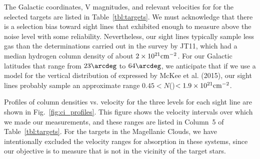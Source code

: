 \documentclass[modern]{aastex63}
\begin{document}
The Galactic coordinates, V magnitudes, and relevant velocities for  for the selected 
targets are listed in Table~\ref{tbl:targets}.   We must acknowledge that there is a selection bias 
toward sight lines that exhibited enough  to measure above the noise level with some 
reliability.  Nevertheless, our sight lines typically sample less gas than the determinations 
carried out in the survey by JT11, which had a median hydrogen column density of about 
$2\times 10^{21}{\rm cm}^{-2}$.  For our Galactic latitudes that range from $23\arcdeg$ to 
$64\arcdeg$, we anticipate that if we use a model for the vertical distribution of  
expressed by McKee et al. (2015), our sight lines probably sample an approximate range $0.45 
\lt N$()$ < 1.9\times 10^{21}{\rm cm}^{-2}$.

 Profiles of column densities vs. velocity for the three  levels for each sight line are 
shown in Fig.~\ref{fig:ci_profiles}.  This figure shows the velocity intervals over which we made 
our measurements, and these ranges are listed in Column~5 of Table~\ref{tbl:targets}.  For the 
targets in the Magellanic Clouds, we have intentionally excluded the velocity ranges for 
absorption in these systems, since our objective is to measure  that is not in the 
vicinity of the target stars. 
\end{document}
